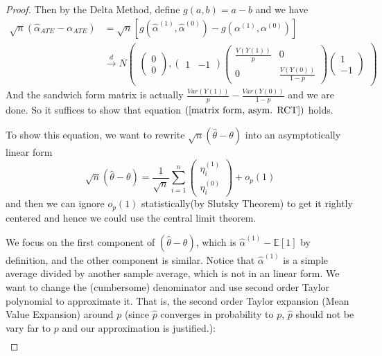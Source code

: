 \documentclass[11pt,a4paper]{amsart}
\theoremstyle{plain}
\theoremstyle{definition}
\begin{document}
\begin{proof}
		Then by the Delta Method, define $g(a,b) = a-b$ and we have 
		\[	\begin{aligned}
		\sqrt{n}(\hat{\alpha}_{ATE} - \alpha_{ATE}) &= \sqrt{n}[g(\hat{\alpha}^{(1)}, \hat{\alpha}^{(0)}) - g(\alpha^{(1)},\alpha^{(0)})]	\\
		&\stackrel{d}{\longrightarrow} N\begin{pmatrix}
		\begin{pmatrix}
		0 \\
		0
		\end{pmatrix}
		, \begin{pmatrix}
		1 & -1
		\end{pmatrix} \begin{pmatrix}
		\frac{V(Y(1))}{p} & 0 \\
		0 & \frac{V(Y(0))}{1-p} 
		\end{pmatrix}
		\begin{pmatrix}
		1 \\
		-1
		\end{pmatrix}
		\end{pmatrix}
		\end{aligned}\]
		And the sandwich form matrix is actually $\frac{Var(Y(1))}{p} - \frac{Var(Y(0))}{1-p}$ and we are done. So it suffices to show that equation $(\ref{matrix form, asym. RCT})$ holds.\par 
		To show this equation, 	we want to rewrite $\sqrt{n}(\hat{\theta} - \theta)$ into an asymptotically linear form 
		\[	\sqrt{n}(\hat{\theta} - \theta) = 
		\frac{1}{\sqrt{n}}\sum_{i = 1}^{n}\begin{pmatrix}
		\eta_{i}^{(1)}\\
		\eta_{i}^{(0)}
		\end{pmatrix} + o_{p}(1)	\]
		and then we can ignore $o_{p}(1)$ statistically(by Slutsky Theorem) to get it rightly centered and hence we could use the central limit theorem. \par 
		We focus on the first component of $(\hat{\theta} - \theta)$, which is $\hat{\alpha}^{(1)} - \mathbb{E}[1]$ by definition, and the other component is similar. Notice that $\hat{\alpha}^{(1)}$ is a simple average divided by another sample average, which is not in an linear form. We want to change the (cumbersome) denominator and use second order Taylor polynomial to approximate it. That is, the second order Taylor expansion (Mean Value Expansion) around $p$ (since $\hat{p}$ converges in probability to $p$, $\hat{p}$ should not be vary far to $p$ and our approximation is justified.):
		\[	\begin{aligned}

\end{aligned}\]
\end{proof}
\end{document}
